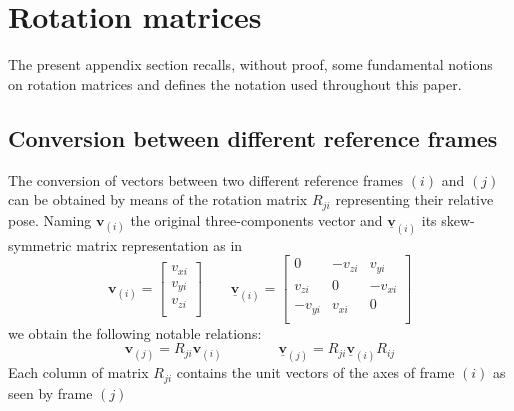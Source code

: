\documentclass[preprint, 12pt]{elsarticle}
\def\vect#1{{\boldsymbol{#1}}}
\begin{document}

\clearpage
\appendix

\section{Rotation matrices}
\label{app:RotatMatrix}
The present appendix section recalls, without proof, some fundamental notions on rotation matrices \cite{joe-angoli,joe-prj} and defines the notation used throughout this paper.

\subsection{Conversion between different reference frames}
\label{app:RotatMatrix1}
The conversion of vectors between two different reference frames $(i)$ and $(j)$ can be obtained by means of the rotation matrix $R_{ji}$ representing their relative pose. Naming $\vect{v}_{(i)}$ the original three-components vector and $\underline{\vect{v}}_{(i)}$ its skew-symmetric matrix representation as in
\begin{equation}
    \vect{v}_{(i)} = \left[
    \begin{array}{c}
            v_{xi} \\
            v_{yi} \\
            v_{zi} \\
    \end{array}
    \right] \qquad {\underline{\vect{v}}_{(i)}} = \left[
    \begin{array}{ccc}
            0 & -v_{zi} & v_{yi} \\
            v_{zi} & 0 & -v_{xi} \\
            -v_{yi} & v_{xi} & 0 \\
    \end{array}
    \right]
    \label{eq:VV_}
\end{equation}
we obtain the following notable relations:
\begin{equation}
    \vect{v}_{(j)} = R_{ji} \vect{v}_{(i)} \qquad\qquad \underline{\vect{v}}_{(j)} = R_{ji} \underline{\vect{v}}_{(i)} R_{ij}
    \label{eq:cambioRif}
\end{equation}
Each column of matrix $R_{ji}$ contains the unit vectors of the axes of frame  $(i)$ as seen by frame $(j)$
\end{document}
